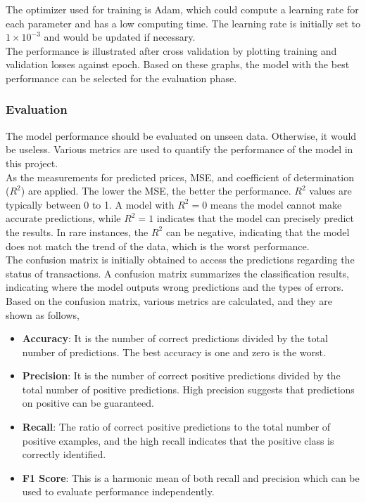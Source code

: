 \documentclass[12pt,twoside]{report}
\begin{document}
The optimizer used for training is Adam, which could compute a learning rate for each parameter and has a low computing time. The learning rate is initially set to $1 \times 10^{-3}$ and would be updated if necessary.
\\

The performance is illustrated after cross validation by plotting training and validation losses against epoch. Based on these graphs, the model with the best performance can be selected for the evaluation phase. 

\subsubsection{Evaluation}
The model performance should be evaluated on unseen data. Otherwise, it would be useless. Various metrics are used to quantify the performance of the model in this project. 
\\

As the measurements for predicted prices, MSE, and coefficient of determination ($R^2$) are applied.  The lower the MSE, the better the performance. $R^2$ values are typically between 0 to 1. A model with $R^2 = 0$ means the model cannot make accurate predictions, while $R^2 = 1$ indicates that the model can precisely predict the results. In rare instances, the $R^2$ can be negative, indicating that the model does not match the trend of the data, which is the worst performance. 
\\

The confusion matrix is initially obtained to access the predictions regarding the status of transactions. A confusion matrix summarizes the classification results, indicating where the model outputs wrong predictions and the types of errors. Based on the confusion matrix, various metrics are calculated, and they are shown as follows, 
\begin{itemize}
	\item \textbf{Accuracy}: It is the number of correct predictions divided by the total number of predictions. The best accuracy is one and zero is the worst. 
	\item \textbf{Precision}: It is the number of correct positive predictions divided by the total number of positive predictions. High precision suggests that predictions on positive can be guaranteed.
	\item \textbf{Recall}: The ratio of correct positive predictions to the total number of positive examples, and the high recall indicates that the positive class is correctly identified. 
	\item \textbf{F1 Score}: This is a harmonic mean of both recall and precision which can be used to evaluate performance independently. 
\end{itemize}
\end{document}
